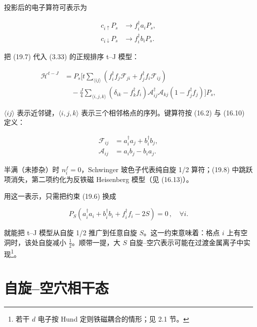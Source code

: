 投影后的电子算符可表示为

\begin{align*}
c _ {i \uparrow} P _ {s} & \rightarrow f _ {i} ^ {\dagger} a _ {i} P _ {s} ,\\
c _ {i \downarrow} P _ {s} & \rightarrow f _ {i} ^ {\dagger} b _ {i} P _ {s} .
\tag{19.7}
\end{align*}

把 (19.7) 代入 (3.33) 的正规排序 t--J 模型：

\begin{align*}
\mathcal {H} ^ {t - J} & = P _ {s} \Bigg[ t \sum_{\langle ij \rangle} \left( f _ {i} ^ {\dagger} f _ {j} \mathcal {F}_{ji} + f _ {j} ^ {\dagger} f _ {i} \mathcal {F}_{ij} \right)\\
& \quad - \frac {J}{4} \sum_{\langle i, j, k \rangle} \left( \delta_{ik} - f _ {k} ^ {\dagger} f _ {i} \right) \mathcal {A}_{ij} ^ {\dagger} \mathcal {A}_{kj} \left( 1 - f _ {j} ^ {\dagger} f _ {j} \right) \Bigg] P _ {s} ,
\tag{19.8}
\end{align*}

$\langle ij\rangle$ 表示近邻键，$\langle i,j,k\rangle$ 表示三个相邻格点的序列。键算符按 (16.2) 与 (16.10) 定义：

\begin{align*}
\mathcal {F} _ {ij} & = a _ {i} ^ {\dagger} a _ {j} + b _ {i} ^ {\dagger} b _ {j} ,\\
\mathcal {A} _ {ij} & = a _ {i} b _ {j} - b _ {i} a _ {j} .
\tag{19.9}
\end{align*}

半满（未掺杂）时 $n_{i}^{f} = 0$，Schwinger 玻色子代表纯自旋 1/2 算符；(19.8) 中跳跃项消失，第二项约化为反铁磁 Heisenberg 模型（见 (16.13)）。

用这一表示，只需把约束 (19.6) 换成

\begin{equation*}
P _ {S} \left( a _ {i} ^ {\dagger} a _ {i} + b _ {i} ^ {\dagger} b _ {i} + f _ {i} ^ {\dagger} f _ {i} - 2S \right) = 0 \, , \quad \forall i.
\tag{19.10}
\end{equation*}

就能把 t--J 模型从自旋 1/2 推广到任意自旋 $S$。这一约束意味着：格点 $i$ 上有空洞时，该处自旋减小 $\frac{1}{2}$。顺带一提，大 $S$ 自旋--空穴表示可能在过渡金属离子中实现\footnote{若干 $d$ 电子按 Hund 定则铁磁耦合的情形；见 2.1 节。}。

\section{自旋--空穴相干态}

